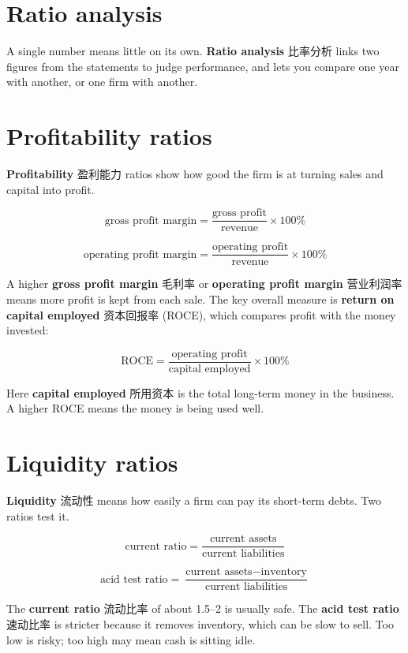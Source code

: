 \documentclass[11pt]{article}
\begin{document}
\section*{Ratio analysis}

A single number means little on its own. \textbf{Ratio analysis} 比率分析 links two figures from the statements to judge performance, and lets you compare one year with another, or one firm with another.

\section*{Profitability ratios}

\textbf{Profitability} 盈利能力 ratios show how good the firm is at turning sales and capital into profit.

\[
\text{gross profit margin} = \frac{\text{gross profit}}{\text{revenue}} \times 100\%
\]

\[
\text{operating profit margin} = \frac{\text{operating profit}}{\text{revenue}} \times 100\%
\]

A higher \textbf{gross profit margin} 毛利率 or \textbf{operating profit margin} 营业利润率 means more profit is kept from each sale. The key overall measure is \textbf{return on capital employed} 资本回报率 (ROCE), which compares profit with the money invested:

\[
\text{ROCE} = \frac{\text{operating profit}}{\text{capital employed}} \times 100\%
\]

Here \textbf{capital employed} 所用资本 is the total long-term money in the business. A higher ROCE means the money is being used well.

\section*{Liquidity ratios}

\textbf{Liquidity} 流动性 means how easily a firm can pay its short-term debts. Two ratios test it.

\[
\text{current ratio} = \frac{\text{current assets}}{\text{current liabilities}}
\]

\[
\text{acid test ratio} = \frac{\text{current assets} - \text{inventory}}{\text{current liabilities}}
\]

The \textbf{current ratio} 流动比率 of about 1.5–2 is usually safe. The \textbf{acid test ratio} 速动比率 is stricter because it removes inventory, which can be slow to sell. Too low is risky; too high may mean cash is sitting idle.
\end{document}
